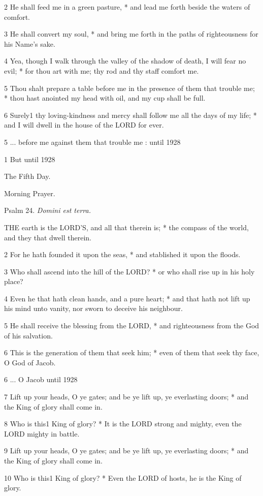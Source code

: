 2 He shall feed me in a green pasture, * and lead me
forth beside the waters of comfort.

3 He shall convert my soul, * and bring me forth in
the paths of righteousness for his Name’s sake.

4 Yea, though I walk through the valley of the shadow
of death, I will fear no evil; * for thou art with me; thy rod and thy
staff comfort me.

5 Thou shalt prepare a table before me in the presence
of them that trouble me; * thou hast anointed my head with oil, and my
cup shall be full.

6 Surely1 thy loving-kindness and mercy
shall follow me all the days of my life; * and I will dwell in the house
of the LORD for ever. 

5 ... before me against them that
trouble me :
until 1928

1 But
until 1928

The Fifth Day.

Morning
Prayer.

Psalm
24. \emph{Domini est terra.}

THE
earth is the LORD'S, and all that therein is; *
the compass of the world, and they that dwell therein.

2 For he hath founded it upon the seas, * and stablished
it upon the floods.

3 Who shall ascend into the hill of the LORD?
* or who shall rise up in his holy place?

4 Even he that hath clean hands, and a pure heart;
* and that hath not lift up his mind unto vanity, nor sworn to deceive
his neighbour.

5 He shall receive the blessing from the LORD,
* and righteousness from the God of his salvation.

6 This is the generation of them that seek him; * even
of them that seek thy face, O God of Jacob.

6 ... O Jacob
until 1928

7 Lift up your heads, O ye gates; and be ye lift up,
ye everlasting doors; * and the King of glory shall come in.

8 Who is this1 King of glory? * It is the
LORD strong and mighty, even the LORD
mighty in battle.

9 Lift up your heads, O ye gates; and be ye lift up,
ye everlasting doors; * and the King of glory shall come in.

10 Who is this1 King of glory? * Even the
LORD of hosts, he is the King of glory.

